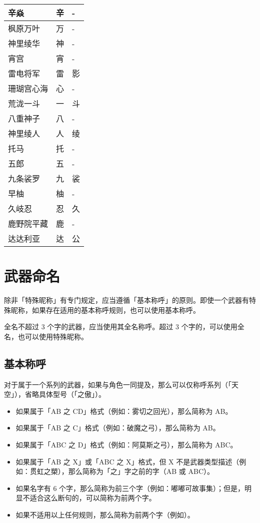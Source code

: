 \begin{longtabu}{|X[2c]|X[c]|X[c]|}
	{辛焱} & {辛} & {-} \\
	\hline
	{枫原万叶} & {万} & {-} \\
	{神里绫华} & {神} & {-} \\
	{宵宫} & {宵} & {-} \\
	{雷电将军} & {雷} & {影} \\
	{珊瑚宫心海} & {心} & {-} \\
	{荒泷一斗} & {一} & {斗} \\
	{八重神子} & {八} & {-} \\
	{神里绫人} & {人} & {绫} \\
	\hline
	{托马} & {托} & {-} \\
	{五郎} & {五} & {-} \\
	{九条裟罗} & {九} & {裟} \\
	{早柚} & {柚} & {-} \\
	{久岐忍} & {忍} & {久} \\
	{鹿野院平藏} & {鹿} & {-} \\
	\hline
	{达达利亚} & {达} & {公} \\
\end{longtabu}




\section{武器命名}

除非「特殊昵称」有专门规定，应当遵循「基本称呼」的原则。即使一个武器有特殊昵称，如果存在适用的基本称呼规则，也可以使用基本称呼。

全名不超过 3 个字的武器，应当使用其全名称呼。超过 3 个字的，可以使用全名，也可以使用特殊昵称。

\subsection{基本称呼}

对于属于一个系列的武器，如果与角色一同提及，那么可以仅称呼系列（「天空」），省略具体型号（「之傲」）。

\begin{itemize}
	\item 如果属于「AB 之 CD」格式（例如：雾切之回光），那么简称为 AB。
	\item 如果属于「AB 之 C」格式（例如：破魔之弓），那么简称为 AB。
	\item 如果属于「ABC 之 D」格式（例如：阿莫斯之弓），那么简称为 ABC。
	\item 如果属于「AB 之 X」或「ABC 之 X」格式，但 X 不是武器类型描述（例如：贯虹之槊），那么简称为「之」字之前的字（AB 或 ABC）。
	\item 如果名字有 6 个字，那么简称为前三个字（例如：嘟嘟可故事集）；但是，明显不适合这么断句的，可以简称为前两个字。
	\item 如果不适用以上任何规则，那么简称为前两个字（例如）。
\end{itemize}

